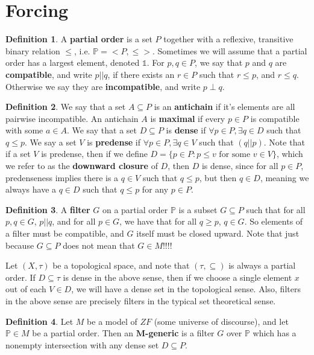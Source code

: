 \documentclass{article}
\theoremstyle{definition}
\newtheorem{definition}{Definition}[section]
\theoremstyle{plain}
\theoremstyle{theorem}
\begin{document}
\section{Forcing}
\begin{definition}
	A \textbf{partial order} is a set $P$ together with a reflexive, transitive binary relation $\leq$, i.e. $\mathbb{P} = < P, \leq > $. Sometimes we will assume that a partial order has a largest element, denoted $\mathbb{1}$. For $p,q \in P$, we say that $p$ and $q$ are \textbf{compatible}, and write $p || q$, if there exists an $r \in P$ such that $r \leq p$, and $r \leq q$. Otherwise we say they are \textbf{incompatible}, and write $p \perp q$. 
\end{definition}
\begin{definition}
	We say that a set $A \subseteq P$ is an \textbf{antichain} if it's elements are all pairwise incompatible. An antichain $A$ is \textbf{maximal} if every $p \in P$ is compatible with some $a \in A$. We say that a set $D \subseteq P$ is \textbf{dense} if $\forall p \in P, \exists q \in D$ such that $q \leq p$. We say a set $V$ is \textbf{predense} if $\forall p \in P,\exists q \in V$ such that $(q || p)$. Note that if a set $V$ is predense, then if we define $D = \{p \in P: p \leq v \textrm{ for some } v \in V \}$, which we refer to as the \textbf{downward closure} of $D$, then $D$ is dense, since for all $p \in P$, predenseness implies there is a $q \in V$ such that $q \leq p$, but then $q \in D$, meaning we always have a $q \in D$ such that $q \leq p$ for any $p \in P$.
\end{definition}
\begin{definition}
	A \textbf{filter} $G$ on a partial order $\mathbb{P}$ is a subset $G \subseteq P$ such that for all $p,q \in G$, $p||q$, and for all $p \in G$, we have that for all $q \geq p$, $q \in G$. So elements of a filter must be compatible, and $G$ itself must be closed upward. Note that just because $G \subseteq P$ does not mean that $G \in M$!!!!
\end{definition}
Let $(X,\tau)$ be a topological space, and note that $(\tau,\subseteq)$ is always a partial order. If $D \subseteq \tau$ is dense in the above sense, then if we choose a single element $x$ out of each $V \in D$, we will have a dense set in the topological sense. Also, filters in the above sense are precisely filters in the typical set theoretical sense. 
\begin{definition}
	Let $M$ be a model of $ZF$ (some universe of discourse), and let $\mathbb{P} \in M$ be a partial order. Then an \textbf{$\bm{M}$-generic} is a filter $G$ over $\mathbb{P}$ which has a nonempty intersection with any dense set $D \subseteq P$. 
\end{definition}
\end{document}

